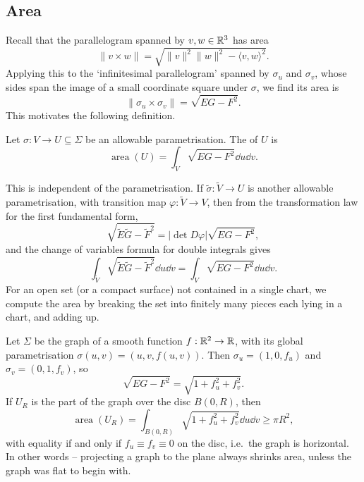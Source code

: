 \documentclass[a4paper]{scrartcl}
\begin{document}
\subsection{Area}

Recall that the parallelogram spanned by $v, w \in \mathbb{R}^3$ has area
$$
\|v \times w\| = \sqrt{\|v\|^2\|w\|^2 - \langle v, w\rangle^2}.
$$
Applying this to the `infinitesimal parallelogram' spanned by $\sigma_u$ and $\sigma_v$, whose sides span the image of a small coordinate square under $\sigma$, we find its area is
$$
\|\sigma_u \times \sigma_v\| = \sqrt{EG - F^2}.
$$
This motivates the following definition.

\begin{definition}[Area]
    Let $\sigma: V \rightarrow U \subseteq \Sigma$ be an allowable parametrisation. The  of $U$ is
    $$
    \operatorname{area}(U) = \int_V \sqrt{EG - F^2} \dd u \dd v.
    $$
\end{definition}

\begin{remark}
    This is independent of the parametrisation. If $\tilde{\sigma}: \tilde{V} \rightarrow U$ is another allowable parametrisation, with transition map $\varphi: \tilde V \rightarrow V$, then from the transformation law for the first fundamental form,
    $$
    \sqrt{\tilde E \tilde G - \tilde F^2} = |{\det D\varphi}| \sqrt{EG - F^2},
    $$
    and the change of variables formula for double integrals gives
    $$
    \int_{\tilde V} \sqrt{\tilde E \tilde G - \tilde F^2} \dd u \dd v = \int_V \sqrt{EG - F^2} \dd u \dd v.
    $$
    For an open set (or a compact surface) not contained in a single chart, we compute the area by breaking the set into finitely many pieces each lying in a chart, and adding up.
\end{remark}

\begin{example}
    Let $\Sigma$ be the graph of a smooth function $f: \mathbb{R}^2 \rightarrow \mathbb{R}$, with its global parametrisation $\sigma(u, v) = (u, v, f(u, v))$. Then $\sigma_u = (1, 0, f_u)$ and $\sigma_v = (0, 1, f_v)$, so
    $$
    \sqrt{EG - F^2} = \sqrt{1 + f_u^2 + f_v^2}.
    $$
    If $U_R$ is the part of the graph over the disc $B(0, R)$, then
    $$
    \operatorname{area}(U_R) = \int_{B(0, R)} \sqrt{1 + f_u^2 + f_v^2} \dd u \dd v \geq \pi R^2,
    $$
    with equality if and only if $f_u \equiv f_v \equiv 0$ on the disc, i.e.\ the graph is horizontal. In other words -- projecting a graph to the plane always shrinks area, unless the graph was flat to begin with.
\end{example}
\end{document}
